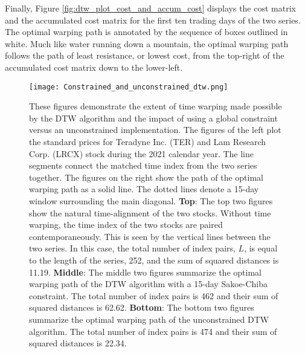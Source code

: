 Finally, Figure \ref{fig:dtw_plot_cost_and_accum_cost} displays the cost matrix and the accumulated cost matrix for the first ten trading days of the two series. The optimal warping path is annotated by the sequence of boxes outlined in white. Much like water running down a mountain, the optimal warping path follows the path of least resistance, or lowest cost, from the top-right of the accumulated cost matrix down to the lower-left.


\begin{figure}
    \centering
    \texttt{[image: Constrained\_and\_unconstrained\_dtw.png]}
    \caption{These figures demonstrate the extent of time warping made possible by the DTW algorithm and the impact of using a global constraint versus an unconstrained implementation. The figures of the left plot the standard prices for Teradyne Inc. (TER) and Lam Research Corp. (LRCX) stock during the 2021 calendar year. The line segments connect the matched time index from the two series together. The figures on the right show the path of the optimal warping path as a solid line. The dotted lines denote a 15-day window surrounding the main diagonal. \textbf{Top}: The top two figures show the natural time-alignment of the two stocks. Without time warping, the time index of the two stocks are paired contemporaneously. This is seen by the vertical lines between the two series. In this case, the total number of index pairs, $L$, is equal to the length of the series, 252, and the sum of squared distances is 11.19. \textbf{Middle}: The middle two figures summarize the optimal warping path of the DTW algorithm with a 15-day Sakoe-Chiba constraint. The total number of index pairs is 462 and their sum of squared distances is 62.62. \textbf{Bottom}: The bottom two figures summarize the optimal warping path of the unconstrained DTW algorithm. The total number of index pairs is 474 and their sum of squared distances is 22.34.}
    \label{fig:constrained_and_unconstrained_dtw}
\end{figure}


